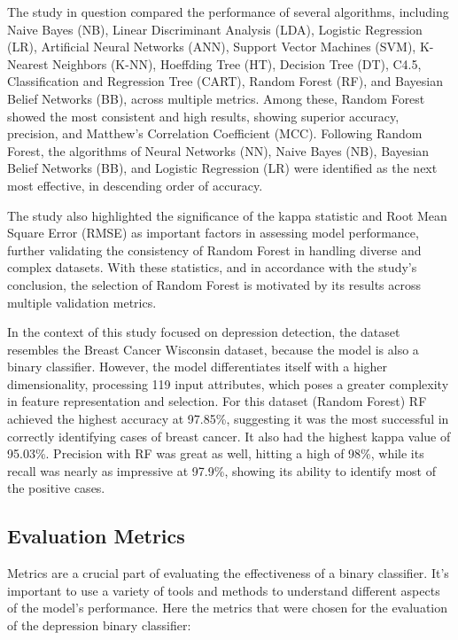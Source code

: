 \documentclass[3p,times,procedia]{elsarticle}
\begin{document}
The study \cite{siraj2023performanceModelComparison} in question compared the performance of several algorithms, including Naive Bayes (NB), Linear Discriminant Analysis (LDA), Logistic Regression (LR), Artificial Neural Networks (ANN), Support Vector Machines (SVM), K-Nearest Neighbors (K-NN), Hoeffding Tree (HT), Decision Tree (DT), C4.5, Classification and Regression Tree (CART), Random Forest (RF), and Bayesian Belief Networks (BB), across multiple metrics. Among these, Random Forest showed the most consistent and high results, showing superior accuracy, precision, and Matthew’s Correlation Coefficient (MCC). Following Random Forest, the algorithms of Neural Networks (NN), Naive Bayes (NB), Bayesian Belief Networks (BB), and Logistic Regression (LR) were identified as the next most effective, in descending order of accuracy.

The study \cite{siraj2023performanceModelComparison} also highlighted the significance of the kappa statistic and Root Mean Square Error (RMSE) as important factors in assessing model performance, further validating the consistency of Random Forest in handling diverse and complex datasets. With these statistics, and in accordance with the study’s conclusion, the selection of Random Forest is motivated by its results across multiple validation metrics.

In the context of this study focused on depression detection, the dataset resembles the Breast Cancer Wisconsin dataset, because the model is also a binary classifier. However, the model differentiates itself with a higher dimensionality, processing 119 input attributes, which poses a greater complexity in feature representation and selection. For this dataset (Random Forest) RF achieved the highest accuracy at 97.85\%, suggesting it was the most successful in correctly identifying cases of breast cancer. It also had the highest kappa value of 95.03\%. Precision with RF was great as well, hitting a high of 98\%, while its recall was nearly as impressive at 97.9\%, showing its ability to identify most of the positive cases.


\subsection{Evaluation Metrics}
\quad Metrics are a crucial part of evaluating the effectiveness of a binary classifier. It's important to use a variety of tools and methods to understand different aspects of the model's performance. Here the metrics that were chosen for the evaluation of the depression binary classifier:
\end{document}
